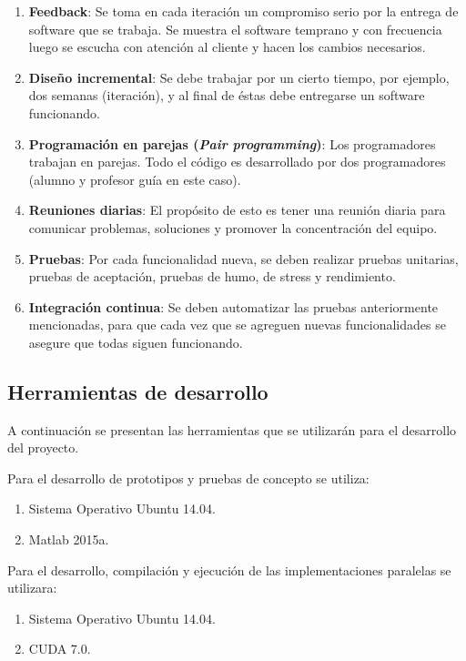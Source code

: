 \begin{enumerate}
\item \textbf{Feedback}: Se toma en cada iteración  un compromiso serio por la entrega de software que  se trabaja. Se muestra el software temprano y con frecuencia luego se escucha con atención al cliente y hacen los cambios necesarios.

\item \textbf{Diseño incremental}: Se debe trabajar por un cierto tiempo, por ejemplo, dos semanas (iteración), y al final de éstas debe entregarse un software funcionando.

\item \textbf{Programación en parejas (\textit{Pair programming})}: Los programadores trabajan en parejas. Todo el código es desarrollado por dos programadores (alumno y profesor guía en este caso).

\item \textbf{Reuniones diarias}: El propósito de esto es tener una reunión diaria para comunicar problemas, soluciones y promover la concentración del equipo.

\item \textbf{Pruebas}: Por cada funcionalidad nueva, se deben realizar pruebas unitarias, pruebas de aceptación, pruebas de humo, de stress y rendimiento.

\item \textbf{Integración continua}: Se deben automatizar las pruebas anteriormente mencionadas, para que cada vez que se agreguen nuevas funcionalidades se asegure que todas siguen funcionando.
\end{enumerate}

\subsection{Herramientas de desarrollo}
A continuación se presentan las herramientas que se utilizarán para el desarrollo del
proyecto.


Para el desarrollo de prototipos y pruebas de concepto se utiliza:
\begin{enumerate}
\item Sistema Operativo Ubuntu 14.04.
\item Matlab 2015a.
\end{enumerate}
Para el desarrollo, compilación y ejecución de las implementaciones paralelas se utilizara:
\begin{enumerate}
\item Sistema Operativo Ubuntu 14.04.
\item CUDA 7.0.
\end{enumerate}

